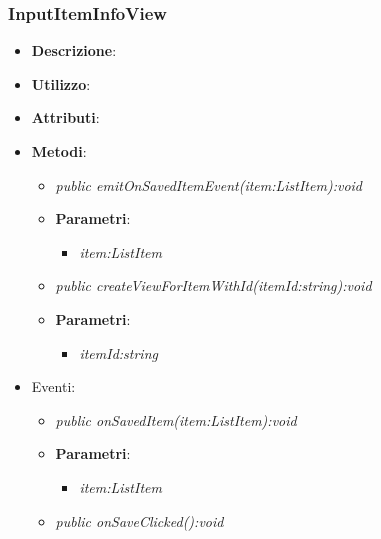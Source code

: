 \subsubsection{InputItemInfoView}
\begin{itemize}
\item \textbf{Descrizione}: 
\item \textbf{Utilizzo}:
\item \textbf{Attributi}:
\item \textbf{Metodi}:
	\begin{itemize}
	\item \textit{public emitOnSavedItemEvent(item:ListItem):void}\\

			\item{\textbf{Parametri}: \begin{itemize}
			\item \textit{item:ListItem}\\

			\end{itemize}}
	\item \textit{public createViewForItemWithId(itemId:string):void}\\

			\item{\textbf{Parametri}: \begin{itemize}
			\item \textit{itemId:string}\\

			\end{itemize}}
	\end{itemize}
\item{Eventi}:
	\begin{itemize}
	\item \textit{public onSavedItem(item:ListItem):void}\\

			\item{\textbf{Parametri}: \begin{itemize}
			\item \textit{item:ListItem}\\

			\end{itemize}}
	\item \textit{public onSaveClicked():void}\\

	\end{itemize}
\end{itemize}